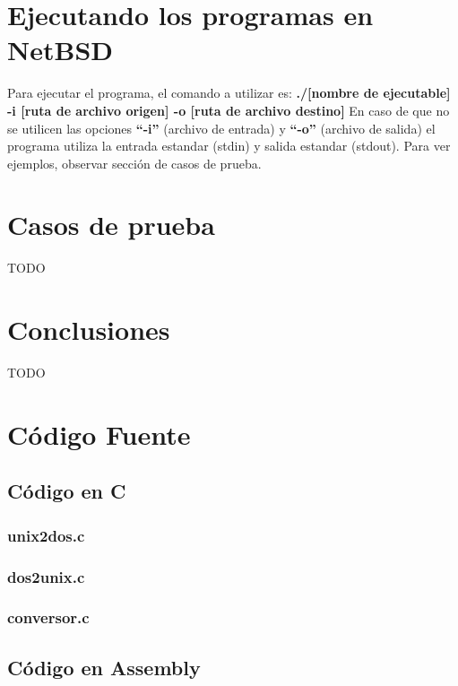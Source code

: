 \documentclass[a4paper,10pt]{article}
\begin{document}
\section{Ejecutando los programas en NetBSD}
  Para ejecutar el programa, el comando a utilizar es:
  \newline
  {\bf./[nombre de ejecutable] -i [ruta de archivo origen] -o [ruta de archivo destino]}
  \newline
  En caso de que no se utilicen las opciones {\bf ``-i''} (archivo de entrada) y {\bf ``-o''} (archivo de salida) el 
  programa utiliza la entrada estandar (stdin) y salida estandar (stdout). Para ver ejemplos, observar 
  secci\'on de casos de prueba.

\section{Casos de prueba}
  TODO
\newpage
\section{Conclusiones}
  TODO

\appendix
\newpage
\section{C\'odigo Fuente}
  \subsection{C\'odigo en C}
    \subsubsection{unix2dos.c}
      \lstset{numbers=left, frame=single, breaklines=true}
      
    \subsubsection{dos2unix.c}
      \lstset{numbers=left, frame=single, breaklines=true}
      
    \subsubsection{conversor.c}
      \lstset{numbers=left, frame=single, breaklines=true}
      
  \newpage
  \subsection{C\'odigo en Assembly}
\end{document}

